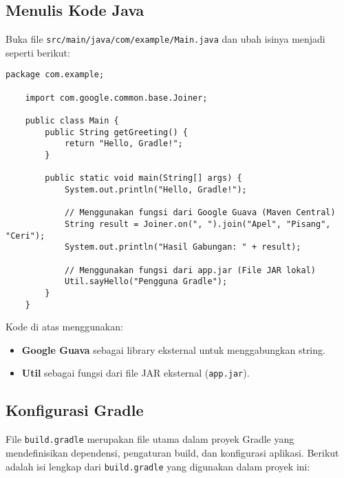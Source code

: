 \subsection{Menulis Kode Java}
Buka file \texttt{src/main/java/com/example/Main.java} dan ubah isinya menjadi seperti berikut:
\begin{lstlisting}[style=JavaStyle]
	package com.example;
	
	import com.google.common.base.Joiner;
	
	public class Main {
		public String getGreeting() {
			return "Hello, Gradle!";
		}
		
		public static void main(String[] args) {
			System.out.println("Hello, Gradle!");
			
			// Menggunakan fungsi dari Google Guava (Maven Central)
			String result = Joiner.on(", ").join("Apel", "Pisang", "Ceri");
			System.out.println("Hasil Gabungan: " + result);
			
			// Menggunakan fungsi dari app.jar (File JAR lokal)
			Util.sayHello("Pengguna Gradle");
		}
	}
\end{lstlisting}

Kode di atas menggunakan:
\begin{itemize}
	\item \textbf{Google Guava} sebagai library eksternal untuk menggabungkan string.
	\item \textbf{Util} sebagai fungsi dari file JAR eksternal (\texttt{app.jar}).
\end{itemize}

\subsection{Konfigurasi Gradle}
File \texttt{build.gradle} merupakan file utama dalam proyek Gradle yang mendefinisikan dependensi, pengaturan build, dan konfigurasi aplikasi. Berikut adalah isi lengkap dari \texttt{build.gradle} yang digunakan dalam proyek ini:

